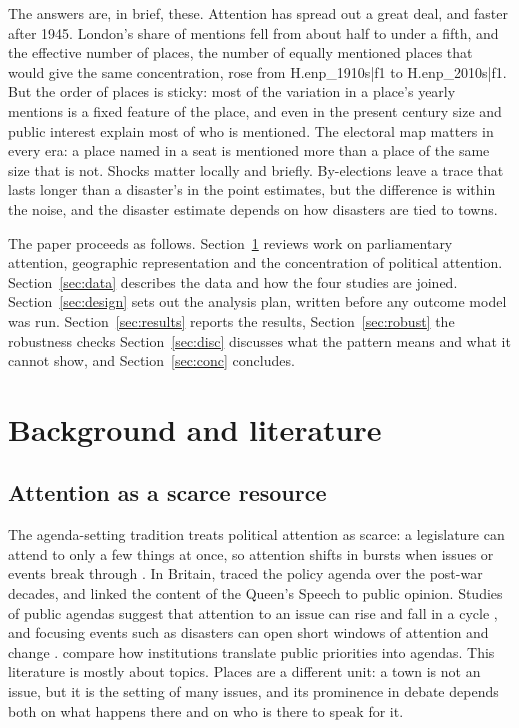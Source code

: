 \documentclass[11pt,a4paper]{article}
\begin{document}
The answers are, in brief, these. Attention has spread out a great deal, and faster after 1945. London's share of mentions fell from about half to under a fifth, and the effective number of places, the number of equally mentioned places that would give the same concentration, rose from {{H.enp_1910s|f1}} to {{H.enp_2010s|f1}}. But the order of places is sticky: most of the variation in a place's yearly mentions is a fixed feature of the place, and even in the present century size and public interest explain most of who is mentioned. The electoral map matters in every era: a place named in a seat is mentioned more than a place of the same size that is not. Shocks matter locally and briefly. By-elections leave a trace that lasts longer than a disaster's in the point estimates, but the difference is within the noise, and the disaster estimate depends on how disasters are tied to towns.

The paper proceeds as follows. Section~\ref{sec:lit} reviews work on parliamentary attention, geographic representation and the concentration of political attention. Section~\ref{sec:data} describes the data and how the four studies are joined. Section~\ref{sec:design} sets out the analysis plan, written before any outcome model was run. Section~\ref{sec:results} reports the results, Section~\ref{sec:robust} the robustness checks Section~\ref{sec:disc} discusses what the pattern means and what it cannot show, and Section~\ref{sec:conc} concludes.

\section{Background and literature}\label{sec:lit}
\subsection{Attention as a scarce resource}
The agenda-setting tradition treats political attention as scarce: a legislature can attend to only a few things at once, so attention shifts in bursts when issues or events break through \citep{baumgartner1993,jones2005,kingdon1984}. In Britain, \citet{john2013} traced the policy agenda over the post-war decades, and \citet{jenningsjohn2009} linked the content of the Queen's Speech to public opinion. Studies of public agendas suggest that attention to an issue can rise and fall in a cycle \citep{downs1972}, and focusing events such as disasters can open short windows of attention and change \citep{birkland1998}. \citet{bevanjennings2014} compare how institutions translate public priorities into agendas. This literature is mostly about topics. Places are a different unit: a town is not an issue, but it is the setting of many issues, and its prominence in debate depends both on what happens there and on who is there to speak for it.
\end{document}
